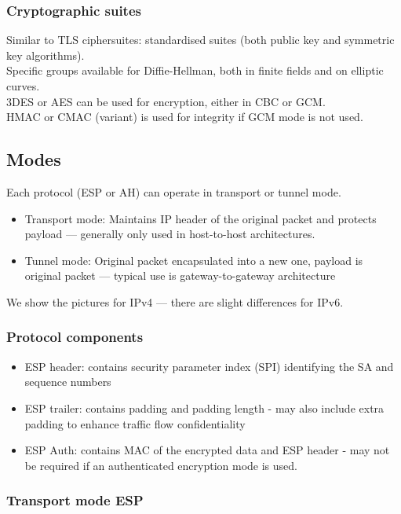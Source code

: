 \documentclass{article}
\begin{document}
\subsubsection{Cryptographic suites}

Similar to TLS ciphersuites: standardised suites (both public key and symmetric key algorithms).\\
Specific groups available for Diffie-Hellman, both in finite fields and on elliptic curves.\\
3DES or AES can be used for encryption, either in CBC or GCM.\\
HMAC or CMAC (variant) is used for integrity if GCM mode is not used.

\subsection{Modes}

Each protocol (ESP or AH) can operate in transport or tunnel mode.
\begin{itemize}
    \item Transport mode: Maintains IP header of the original packet and protects payload — generally only used in host-to-host architectures.
    \item Tunnel mode: Original packet encapsulated into a new one, payload is original packet — typical use is gateway-to-gateway architecture
\end{itemize}
We show the pictures for IPv4 — there are slight differences for IPv6.

\subsubsection{Protocol components}

\begin{itemize}
    \item ESP header: contains security parameter index (SPI) identifying the SA and sequence numbers
    \item ESP trailer: contains padding and padding length - may also include extra padding to enhance traffic flow confidentiality
    \item ESP Auth: contains MAC of the encrypted data and ESP header - may not be required if an authenticated encryption mode is used.
\end{itemize}

\subsubsection{Transport mode ESP}
\end{document}
